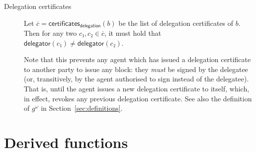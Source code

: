 \documentclass{article}
\newcommand{\transitivefix}[1]{{#1}^ω}
\newcommand{\delegator}[1]{\mathsf{delegator}(#1)}
\newcommand{\delegationcertificates}[1]{\mathsf{certificates}_\mathsf{delegation}(#1)}
\begin{document}
\begin{description}
\item[Delegation certificates] Let
  $\overline{c}=\delegationcertificates{b}$ be the list of delegation
  certificates of $b$. Then for any two $c₁,c₂∈\overline{c}$, it must
  hold that $\delegator{c₁}≠\delegator{c₂}$.

  Note that this prevents any agent which has issued a delegation
  certificate to another party to issue any block: they \emph{must} be
  signed by the delegatee (or, transitively, by the agent authorised
  to sign instead of the delegatee). That is, until the agent issues a
  new delegation certificate to itself, which, in effect, revokes any
  previous delegation certificate. See also the definition of
  $\transitivefix{g}$ in Section~\ref{sec:definitions}.

\end{description}

\section{Derived functions}
\label{sec:derived-functions}

\end{document}
